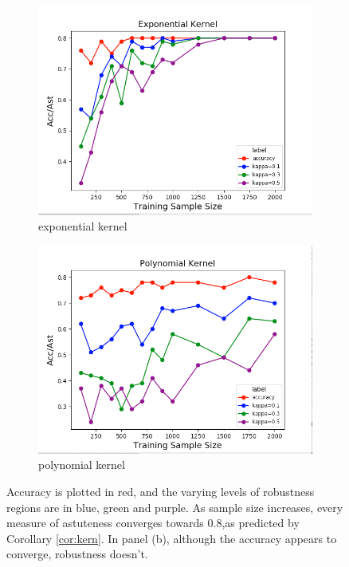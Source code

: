 \begin{figure}
\begin{subfigure}{0.45\textwidth}
\includegraphics[width=\linewidth]{exponential.png}
\caption{exponential kernel} 
\end{subfigure}\hspace*{\fill}
\begin{subfigure}{0.45\textwidth}
\includegraphics[width=\linewidth]{polynomial.png}
\caption{polynomial kernel} 
\end{subfigure}

\caption{Accuracy is plotted in red, and the varying levels of robustness regions are in blue, green and purple. As sample size increases, every measure of astuteness converges towards $0.8$,as predicted by Corollary \ref{cor:kern}. In panel (b), although the accuracy appears to converge, robustness doesn't.}
	\label{fig:validation}
\end{figure}

